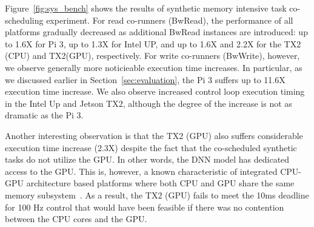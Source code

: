 Figure~\ref{fig:sys_bench} shows the results of synthetic memory
intensive task co-scheduling experiment. 
For read co-runners (BwRead), the performance of all platforms
gradually decreased as additional BwRead instances are introduced: up
to 1.6X for Pi 3, up to 1.3X for Intel UP, and up to 1.6X and 2.2X for the TX2
(CPU) and TX2(GPU), respectively.
For write co-runners (BwWrite), however, we observe generally more
noticieable execution time increases. In particular, as we discussed
earlier in Section~\ref{sec:evaluation}, the Pi 3 suffers up to 11.6X
execution time increase. We also observe increased control loop
execution timing in the Intel Up and Jetson TX2, although the degree
of the increase is not as dramatic as the Pi 3.


Another interesting observation is that the TX2 (GPU) also suffers
considerable execution time increase (2.3X) despite the fact that the
co-scheduled synthetic tasks do not utilize the GPU. In other words,
the DNN model has dedicated access to the GPU. This is, however, a
known characteristic of integrated CPU-GPU architecture based
platforms where both CPU and GPU share the same memory
subsystem~\cite{Ali2017}. As a result, the TX2 (GPU) fails to meet the
10ms deadline for 100 Hz control that would have been feasible if
there was no contention between the CPU cores and the GPU.


